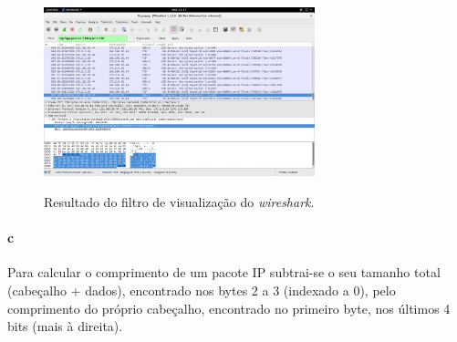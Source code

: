\begin{figure}[h]
\centering
\includegraphics[width=0.7\textwidth]{3_b_screenshot.png}
\label{fig:wireshark}
\caption{Resultado do filtro de visualização do \emph{wireshark}.}
\end{figure}

\paragraph{c}
Para calcular o comprimento de um pacote IP subtrai-se o seu tamanho total (cabeçalho + dados), encontrado nos bytes 2 a 3 (indexado a 0), pelo comprimento do próprio cabeçalho, encontrado no primeiro byte, nos últimos 4 bits (mais à direita).